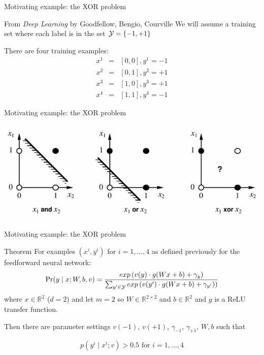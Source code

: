 \begin{frame}{Motivating example: the XOR problem}
\begin{block}{From \textit{Deep Learning} by Goodfellow, Bengio, Courville}
We will assume a training set where each label is in the set ${\cal Y} = \{ -1, +1 \}$

There are four training examples:
\begin{eqnarray*}
x^1 &=& [0,0], y^1 = -1\\
x^2 &=& [0,1], y^2 = +1 \\
x^3 &=& [1,0], y^3 = +1\\
x^4 &=& [1,1], y^4 = -1
\end{eqnarray*}
\end{block}
\end{frame}

\begin{frame}{Motivating example: the XOR problem}
\begin{block}{}
\includegraphics[scale=0.7]{figures/xorfig.png}
\end{block}
\end{frame}

\begin{frame}{Motivating example: the XOR problem}
\begin{block}{Theorem}
For examples $(x^i, y^i)$ for $i = 1,\ldots,4$ as defined previously for the feedforward neural network:
\[ \Pr(y \mid x; W, b, v) = \frac{exp\left(v(y) \cdot g(Wx + b) + \gamma_y \right)}{\sum_{y' \in {\cal Y}} exp\left(v(y') \cdot g(Wx + b) + \gamma_{y'})\right)} \]
where $x \in \mathbb{R}^2$ ($d=2$) and let $m=2$ so $W \in \mathbb{R}^{2\times2}$ and $b \in \mathbb{R}^2$ and $g$ is a ReLU transfer function.

\pause
Then there are parameter settings $v(-1)$, $v(+1)$, $\gamma_{-1}$, $\gamma_{+1}$, $W, b$ such that 

\[ p(y^i \mid x^i; v) > 0.5 \textrm{   for } i = 1, \ldots, 4 \]
\end{block}
\end{frame}

